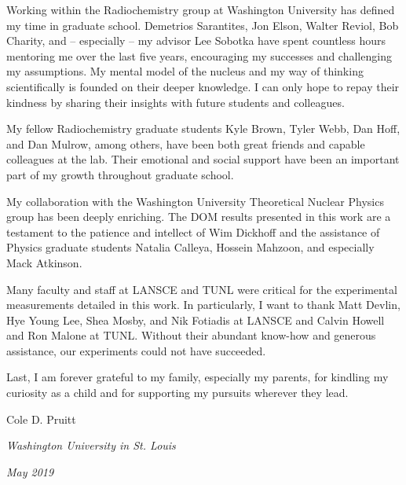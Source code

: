 Working within the Radiochemistry group at Washington University has defined
my time in graduate school. Demetrios Sarantites, Jon Elson,
Walter Reviol, Bob Charity, and -- especially -- my advisor Lee Sobotka have spent
countless hours mentoring me over the last five years, encouraging my successes
and challenging my assumptions. My mental model of the nucleus and my way of thinking
scientifically is founded on their deeper knowledge. I can only hope to repay
their kindness by sharing their insights with future students and colleagues.

My fellow Radiochemistry graduate students Kyle Brown, Tyler Webb, Dan Hoff, and Dan Mulrow,
among others, have been both great friends and capable colleagues at the lab.
Their emotional and social support have been an important part of my
growth throughout graduate school.

My collaboration with the Washington University Theoretical Nuclear Physics group has
been deeply enriching. The DOM results presented in this
work are a testament to the patience and intellect of Wim Dickhoff and 
the assistance of Physics graduate students Natalia Calleya,
Hossein Mahzoon, and especially Mack Atkinson.

Many faculty and staff at LANSCE and TUNL were critical for the 
experimental measurements detailed in this work. In particularly, I want to thank Matt
Devlin, Hye Young Lee, Shea Mosby, and Nik Fotiadis at LANSCE and Calvin Howell
and Ron Malone at TUNL. Without their abundant know-how and generous
assistance, our experiments could not have succeeded.

Last, I am forever grateful to my family, especially my parents, for
kindling my curiosity as a child and for supporting my pursuits wherever they
lead.

\vspace{20pt}

\begin{flushright}
  Cole D. Pruitt
\end{flushright}

\textit{Washington University in St. Louis}

\textit{May 2019}

\clearpage

